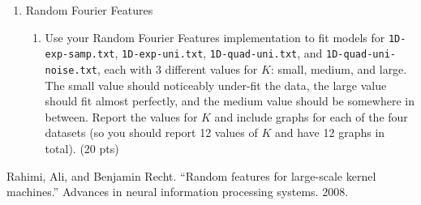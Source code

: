 \documentclass{article} %
\begin{document}
\begin{enumerate}
\begin{enumerate}
	\end{enumerate}
	\item Random Fourier Features
	\begin{enumerate}
		\item Use your Random Fourier Features implementation to fit models for \texttt{1D-exp-samp.txt}, 
		\texttt{1D-exp-uni.txt}, \texttt{1D-quad-uni.txt}, and \texttt{1D-quad-uni-noise.txt}, each with 3 different values 
		for \(K\): small, medium, and large. The small value should noticeably under-fit the data, the large value should fit 
		almost perfectly, and the medium value should be somewhere in between. Report the values for \(K\) and include graphs 
		for each of the four datasets (so you should report 12 values of \(K\) and have 12 graphs in total). (20 pts)

	\end{enumerate}
\end{enumerate}

\begin{thebibliography}{1}

 Rahimi, Ali, and Benjamin Recht. ``Random features for large-scale kernel 
machines.'' Advances in neural information processing systems. 2008.
\end{thebibliography}
\end{document}
